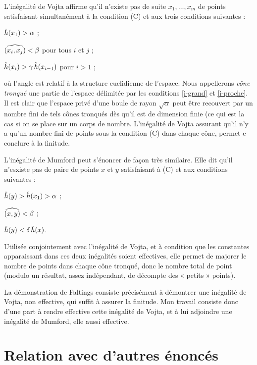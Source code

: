 \documentclass[a4paper, 11pt]{article}
\renewcommand*\bsc{}
\begin{document}
L'inégalité de \bsc{Vojta} affirme qu'il n'existe pas de suite $x_1, \dots,
x_m$ de points satisfaisant simultanément à la condition (C) et aux trois
conditions suivantes :
\begin{enumthm}
  \item $\mathop{\smash{\hat h}}(x_1) > \alpha$ ; \label{i-grand}
  \item $\widehat{(x_i,x_j)} < \beta$ pour tous $i$ et $j$ ; \label{i-proche}
  \item $\mathop{\smash{\hat h}}(x_i) > \gamma \mathop{\smash{\hat h}}(x_{i-1})$ pour $i > 1$ ; 
\end{enumthm}
où l'angle est relatif à la structure euclidienne de l'espace. Nous
appellerons \emph{cône tronqué} une partie de l'espace délimitée par les
conditions \ref{i-grand} et \ref{i-proche}. Il est clair que l'espace privé
d'une boule de rayon $\sqrt{\alpha}$ peut être recouvert par un nombre fini de
tels cônes tronqués dès qu'il est de dimension finie (ce qui est la cas si on
se place sur un corps de nombre. L'inégalité de \bsc{Vojta} assurant qu'il n'y
a qu'un nombre fini de points sous la condition (C) dans chaque cône, permet e
conclure à la finitude.

L'inégalité de \bsc{Mumford} peut s'énoncer de façon très similaire. Elle dit
qu'il n'esxiste pas de paire de points $x$ et $y$ satisfaisant à (C) et aux
conditions suivantes :
\begin{enumthm}
  \item $\mathop{\smash{\hat h}}(y) > \mathop{\smash{\hat h}}(x_1) > \alpha$ ; 
  \item $\widehat{(x,y)} < \beta$ ;
  \item $\mathop{\smash{\hat h}}(y) < \delta \mathop{\smash{\hat h}}(x)$.
\end{enumthm}
Utilisée conjointement avec l'inégalité de \bsc{Vojta}, et à condition que les
constantes apparaissant dans ces deux inégalités soient effectives, elle
permet de majorer le nombre de points dans chaque cône tronqué, donc le nombre
total de point (modulo un résultat, assez indépendant, de décompte des «
petits » points).

La démonstration de \bsc{Faltings} consiste précisément à démontrer une
inégalité de \bsc{Vojta}, non effective, qui suffit à assurer la finitude. Mon
travail consiste donc d'une part à rendre effective cette inégalité de
\bsc{Vojta}, et à lui adjoindre une inégalité de \bsc{Mumford}, elle aussi
effective.

\section{Relation avec d'autres énoncés}
\end{document}
